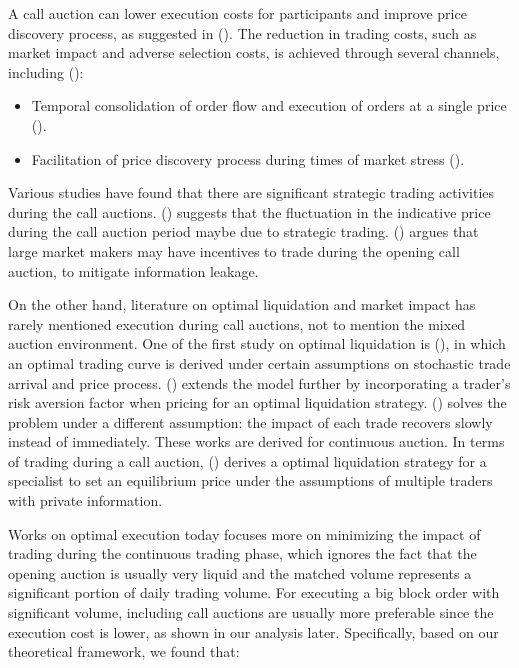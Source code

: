 \documentclass{article}
\begin{document}
A call auction can lower execution costs for participants and improve price discovery process, as suggested in (\cite{Pagano2003}). The reduction in trading costs, such as market impact and adverse selection costs, is achieved through several channels, including (\cite{Carole2006}):

\begin{itemize}
  \item Temporal consolidation of order flow and execution of orders at a single price (\cite{Economides1995}).
  \item Facilitation of price discovery process during times of market stress (\cite{Madhavan1992}).
\end{itemize}

Various studies have found that there are significant strategic trading activities during the call auctions. (\cite{Bruno1999}) suggests that the fluctuation in the indicative price during the call auction period maybe due to strategic trading. (\cite{Vives2001}) argues that large market makers may have incentives to trade during the opening call auction, to mitigate information leakage.

On the other hand, literature on optimal liquidation and market impact has rarely mentioned execution during call auctions, not to mention the mixed auction environment. One of the first study on optimal liquidation is (\cite{HoStoll1981}), in which an optimal trading curve is derived under certain assumptions on stochastic trade arrival and price process. (\cite{AlmgrenChriss2000}) extends the model further by incorporating a trader's risk aversion factor when pricing for an optimal liquidation strategy. (\cite{Obizhaeva2013}) solves the problem under a different assumption: the impact of each trade recovers slowly instead of immediately. These works are derived for continuous auction. In terms of trading during a call auction, (\cite{Madhavan2015}) derives a optimal liquidation strategy for a specialist to set an equilibrium price under the assumptions of multiple traders with private information.

Works on optimal execution today focuses more on minimizing the impact of trading during the continuous trading phase, which ignores the fact that the opening auction is usually very liquid and the matched volume represents a significant portion of daily trading volume. For executing a big block order with significant volume, including call auctions are usually more preferable since the execution cost is lower, as shown in our analysis later. Specifically, based on our theoretical framework, we found that:
\end{document}
